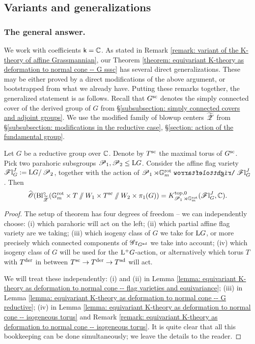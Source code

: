 \subsection{Variants and generalizations}\label{section: variants and generalizations}

\subsubsection{The general answer.}
We work with coefficients $\k=\C$. As stated in Remark \ref{remark: variant of the K-theory of affine Grassmannian}, our Theorem \ref{theorem: equivariant K-theory as deformation to normal cone -- G sssc} has several direct generalizations. These may be either proved by a direct modifications of the above argument, or bootstrapped from what we already have. Putting these remarks together, the generalized statement is as follows. Recall that $G^{\sc}$ denotes the simply connected cover of the derived group of $G$ from \S \ref{subsubsection: simply connected covers and adjoint groups}. We use the modified family of blowup centers $\widetilde{\eZ}$ from \S \ref{subsubsection: modifications in the reductive case}, \S \ref{section: action of the fundamental group}.

\begin{theorem}\label{theorem: equivariant K-theory as deformation to normal cone -- general case}
Let $G$ be a reductive group over $\C$. Denote by $T^{\sc}$ the maximal torus of $G^{\sc}$. Pick two parahoric subsgroups $\eP_1, \eP_2 \leq \lo G$. Consider the affine flag variety $\Fl^J_G := \lo G / \eP_2$, together with the action of $\eP_1 \rtimes \Gm^{\rot} \acts \Fl^J_G$.
Then 
\begin{equation*}
\widehat{\O}(\Bl^{\circ}_{\widetilde{\eZ}}(\Gm^{\rot} \times T\sslash W_1 \times T^{\sc} \sslash W_2 \times \pi_1(G)) = K^{\top, 0}_{\eP_1 \rtimes \Gm^{\rot}}(\Fl^J_G, \C).
\end{equation*}
\end{theorem}


\begin{proof}
The setup of theorem has four degrees of freedom -- we can independently choose:
(i) which parahoric will act on the left;
(ii) which partial affine flag variety are we taking;
(iii) which isogeny class of $G$ we take for $\lo G$, or more precisely which connected components of $\Gr_{G^{\ad}}$ we take into account; 
(iv) which isogeny class of $G$ will be used for the $\lop G$-action, or alternatively which torus $T$ with $T^{\der}$ in between $T^{\sc} \to T^{\der} \to T^{\ad}$ will act.


We will treat these independently: (i) and (ii) in Lemma \ref{lemma: equivariant K-theory as deformation to normal cone -- flag varieties and equivariance}; (iii) in Lemma \ref{lemma: equivariant K-theory as deformation to normal cone -- G reductive}; (iv) in Lemma \ref{lemma: equivariant K-theory as deformation to normal cone -- isogeneous torus} and Remark \ref{remark: equivariant K-theory as deformation to normal cone -- isogeneous torus}. It is quite clear that all this bookkeeping can be done simultaneously; we leave the details to the reader. 
\end{proof}

